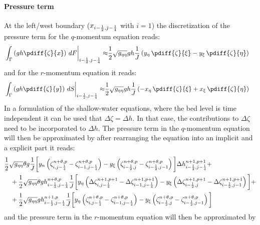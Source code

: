 \paragraph*{Pressure term}
At the left/west boundary ($x_{i-\frac{1}{2}, j-\frac{1}{4}}$ with $i=1$) the discretization of the pressure term  for the $q$-momentum equation reads:
\begin{align}
    \left. \int_\Gamma\left(gh \pdiff{\zeta}{x}\right)\, dF \right|_{i-\half, j-\quart} \approx
    & \half \sqrt{g_{\eta\eta}}  g h \Jinv \left( y_{\eta}\, \pdiff{\zeta}{\xi} - y_{\xi}\, \pdiff{\zeta}{\eta} \right)
\end{align}
and for the $r$-momentum equation it reads:
\begin{align}
    \left. \int_\Gamma\left(gh \pdiff{\zeta}{y}\right)\, dS \right|_{i-\half, j-\quart} \approx
    & \half \sqrt{g_{\eta\eta}}  g h \Jinv \left( -x_{\eta}\, \pdiff{\zeta}{\xi} + x_{\xi}\, \pdiff{\zeta}{\eta} \right)
\end{align}
In a formulation of the shallow-water equations, where the bed level is time independent it can be used that $\Delta \zeta = \Delta h$.
In that case, the contributions to  $\Delta \zeta$ need to be incorporated to $\Delta h$.
The pressure term in the $q$-momentum equation will then be approximated by after rearranging the equation into an implicit and a explicit part it reads:
\begin{align}
    & \frac{1}{2} \sqrt{g_{\eta\eta}} \theta g \frac{1}{J} \bigg[
y_n \left( \zeta^{n+\theta,p}_{i, j-\frac{1}{4}} - \zeta^{n+\theta,p}_{i-1, j-\frac{1}{4}} \right)
    - y_\xi \left( \zeta^{n+\theta,p}_{i-\frac{1}{2}, j} - \zeta^{n+\theta,p}_{i-\frac{1}{2}, j-1} \right) \bigg] \Delta h^{n+1, p+1}_{i-\frac{1}{2}, j-\frac{1}{4}} +
    \nonumber \\
    & \quad +
    \frac{1}{2} \sqrt{g_{\eta\eta}}  \theta g h^{n+\theta, p}_{i-\frac{1}{2}, j-\frac{1}{4}} \frac{1}{J} \bigg[ y_\eta
    \left( \Delta \zeta^{n+1,p+1}_{i, j-\frac{1}{4}}  - \Delta \zeta^{n+1,p+1}_{i-1, j-\frac{1}{4}}\right)
    -y_\xi \left( \Delta \zeta^{n+1,p+1}_{i-\frac{1}{2}, j}  - \Delta \zeta^{n+1,p+1}_{i-\frac{1}{2}, j-1}  \right) \bigg] +
    \nonumber \\*
    & \quad + \frac{1}{2} \sqrt{g_{\eta\eta}} g h^{n+1, p}_{i-\frac{1}{2}, j-\frac{1}{4}} \frac{1}{J} \bigg[
    y_\eta \left( \zeta^{n+\theta,p}_{i, j-\frac{1}{4}} - \zeta^{n+\theta,p}_{i-1, j-\frac{1}{4}} \right)
    - y_\xi \left( \zeta^{n+\theta,p}_{i-\frac{1}{2}, j} - \zeta^{n+\theta,p}_{i-\frac{1}{2}, j-1} \right) \bigg]
\end{align}
and the pressure term in the $r$-momentum equation will then be approximated by
